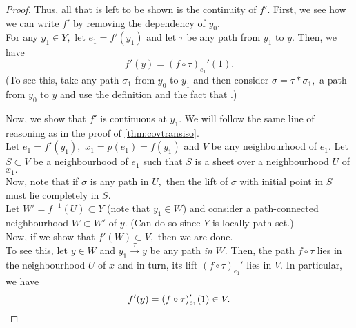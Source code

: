 \documentclass[12pt]{article}
\begin{document}
\begin{proof}
	Thus, all that is left to be shown is the continuity of $f'.$ First, we see how we can write $f'$ by removing the dependency of $y_0.$\\
	For any $y_1 \in Y,$ let $e_1 = f'(y_1)$ and let $\tau$ be any path from $y_1$ to $y.$ Then, we have
	\begin{equation*} 
		f'(y) = (f\circ\tau)_{e_1}'(1).
	\end{equation*}
	(To see this, take any path $\sigma_1$ from $y_0$ to $y_1$ and then consider $\sigma = \tau*\sigma_1,$ a path from $y_0$ to $y$ and use the definition and the fact that .)

	Now, we show that $f'$ is continuous at $y_1.$ We will follow the same line of reasoning as in the proof of \cref{thm:covtransiso}.\\
	Let $e_1 = f'(y_1),$ $x_1 = p(e_1) = f(y_1)$ and $V$ be any neighbourhood of $e_1.$ Let $S \subset V$ be a neighbourhood of $e_1$ such that $S$ is a sheet over a neighbourhood $U$ of $x_1.$ \\
	Now, note that if $\sigma$ is any path in $U,$ then the lift of $\sigma$ with initial point in $S$ must lie completely in $S.$\\
	Let $W' = f^{-1}(U) \subset Y$ (note that $y_1 \in W$) and consider a path-connected neighbourhood $W \subset W'$ of $y.$ (Can do so since $Y$ is locally path set.)\\
	Now, if we show that $f'(W) \subset V,$ then we are done.\\
	To see this, let $y \in W$ and $y_1 \overset{\tau}{\longrightarrow} y$ be any path \emph{in} $W.$ Then, the path $f\circ\tau$ lies in the neighbourhood $U$ of $x$ and in turn, its lift $(f\circ\tau)_{e_1}'$ lies in $V.$ In particular, we have
	\begin{equation*} 
		f'(y) = (f\circ\tau)_{e_1}'(1) \in V. \qedhere
	\end{equation*}
	
\end{proof}
\end{document}
